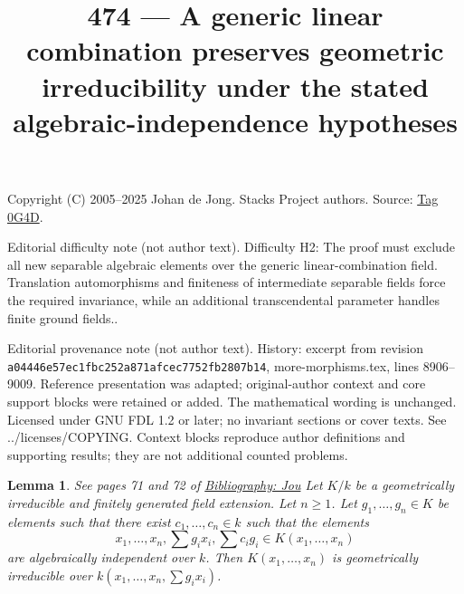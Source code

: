 \documentclass{amsart}
\newenvironment{reference}{\comment}{\endcomment}
\theoremstyle{plain}
\newtheorem{lemma}[subsection]{Lemma}
\theoremstyle{definition}
\theoremstyle{remark}
\numberwithin{equation}{subsection}
\begin{document}
\title[Stacks Project, Tag 0G4D]{474 --- A generic linear combination preserves geometric irreducibility under the stated algebraic-independence hypotheses}
\maketitle
\noindent Copyright (C) 2005--2025 Johan de Jong. Stacks Project authors. Source: \href{https://stacks.math.columbia.edu/tag/0G4D}{Tag 0G4D}.

\noindent Editorial difficulty note (not author text). Difficulty H2: The proof must exclude all new separable algebraic elements over the generic linear-combination field. Translation automorphisms and finiteness of intermediate separable fields force the required invariance, while an additional transcendental parameter handles finite ground fields..

\noindent Editorial provenance note (not author text). History: excerpt from revision \texttt{a0444\allowbreak 6e57e\allowbreak c1fbc\allowbreak 252a8\allowbreak 71afc\allowbreak ec775\allowbreak 2fb28\allowbreak 07b14}, more-morphisms.tex, lines 8906--9009. Reference presentation was adapted; original-author context and core support blocks were retained or added. The mathematical wording is unchanged. Licensed under GNU FDL 1.2 or later; no invariant sections or cover texts. See ../licenses/COPYING. Context blocks reproduce author definitions and supporting results; they are not additional counted problems.

\begin{lemma}
\label{lemma-amazing-bertini-lemma}
\begin{reference}
See pages 71 and 72 of \href{https://stacks.math.columbia.edu/bibliography}{Bibliography: Jou}
\end{reference}
Let $K/k$ be a geometrically irreducible and finitely generated
field extension. Let $n \geq 1$.
Let $g_1, \ldots, g_n \in K$ be elements such that there
exist $c_1, \ldots, c_n \in k$ such that the elements
$$
x_1, \ldots, x_n, \sum g_ix_i, \sum c_ig_i \in K(x_1, \ldots, x_n)
$$
are algebraically independent over $k$. Then
$K(x_1, \ldots, x_n)$ is geometrically irreducible over
$k(x_1, \ldots, x_n, \sum g_ix_i)$.
\end{lemma}
\end{document}

